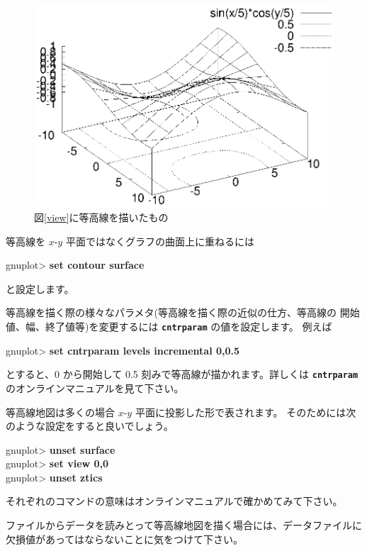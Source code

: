 \documentclass[a4j]{ujarticle} %
\newenvironment{terminal}{%
  \begin{center}
   \begin{minipage}{.8\textwidth}
    \setlength{\FrameSep}{.5\FrameSep}%
    \begin{framed}\ttfamily\small%
     \setlength\baselineskip{.85\baselineskip}%
}{%
    \end{framed}
   \end{minipage}
  \end{center}%
}
\begin{document}
\begin{figure}
\begin{center}
\begin{minipage}[hbtp]{0.49\textwidth}
\includegraphics[width=\hsize]{contour.eps}
\caption{図\ref{view}に等高線を描いたもの}
\label{contour}
\end{minipage}
\end{center}
\end{figure}

等高線を $x$-$y$ 平面ではなくグラフの曲面上に重ねるには
\begin{terminal}
gnuplot> {\bf set contour surface}
\end{terminal}
と設定します。

等高線を描く際の様々なパラメタ(等高線を描く際の近似の仕方、等高線の
開始値、幅、終了値等)を変更するには {\tt\bf cntrparam} の値を設定します。
例えば
\begin{terminal}
gnuplot> {\bf set cntrparam levels incremental 0,0.5}
\end{terminal}
とすると、0 から開始して 0.5 刻みで等高線が描かれます。詳しくは
{\tt\bf cntrparam} のオンラインマニュアルを見て下さい。

等高線地図は多くの場合 $x$-$y$ 平面に投影した形で表されます。
そのためには次のような設定をすると良いでしょう。
\begin{terminal}
gnuplot> {\bf unset surface} \\
gnuplot> {\bf set view 0,0} \\
gnuplot> {\bf unset ztics}
\end{terminal}
それぞれのコマンドの意味はオンラインマニュアルで確かめてみて下さい。

ファイルからデータを読みとって等高線地図を描く場合には、データファイルに
欠損値があってはならないことに気をつけて下さい。
\end{document}

